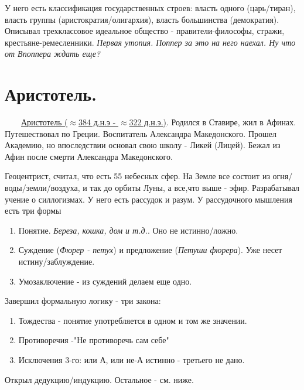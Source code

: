 \documentclass[12pt,a4paper]{article}
\begin{document}
У него есть классификация государственных строев: власть одного (царь/тиран), власть группы (аристократия/олигархия), власть большинства (демократия). Описывал трехклассовое идеальное общество - правители-философы, стражи, крестьяне-ремесленники. \textit{Первая утопия. Поппер за это на него наехал. Ну что от Впоппера ждать еще?}

\section{Аристотель.}
\ \ \ \
\underline{Аристотель ($\approx$384 д.н.э - $\approx$322 д.н.э.)}. Родился в Ставире, жил в Афинах. Путешествовал по Греции. Воспитатель Александра Македонского. Прошел Академию, но впоследствии основал свою школу - Ликей (Лицей). Бежал из Афин после смерти Александра Македонского.

Геоцентрист, считал, что есть 55 небесных сфер. На Земле все состоит из огня/воды/земли/воздуха, и так до орбиты Луны, а все,что выше - эфир. 
Разрабатывал учение о силлогизмах. У него есть рассудок и разум. У рассудочного мышления есть три формы
\begin{enumerate}
\item Понятие. \textit{Береза, кошка, дом и т.д.}. Оно не истинно/ложно.
\item Суждение (\textit{Фюрер - петух}) и предложение (\textit{Петуши фюрера}). Уже несет истину/заблуждение.
\item Умозаключение - из суждений делаем еще одно. 
\end{enumerate}
Завершил формальную логику - три закона:
\begin{enumerate}
\item Тождества - понятие употребляется в одном и том же значении.
\item Противоречия -"Не противоречь сам себе"
\item Исключения 3-го: или А, или не-А истинно - третьего не дано. 
\end{enumerate}
Открыл дедукцию/индукцию.
Остальное - см. ниже.
\end{document}

